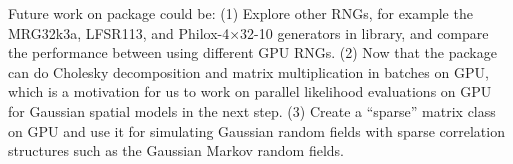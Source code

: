 \documentclass[article,nojss]{jss}\usepackage[]{graphicx}\usepackage[]{color}
\begin{document}
Future work on  package could be: (1) Explore other RNGs, for example the MRG32k3a, LFSR113, and Philox-4×32-10 generators in  library, and compare the  performance between using different GPU RNGs. (2) Now that the package can do Cholesky decomposition and matrix multiplication in batches on GPU, which is a motivation for us to work on parallel likelihood evaluations on GPU for Gaussian spatial models in the next step. (3) Create a ``sparse'' matrix class on GPU and use it for simulating Gaussian random fields with sparse correlation structures such as the Gaussian Markov random fields.










\newpage

\begin{appendix}


\end{appendix}
\end{document}
